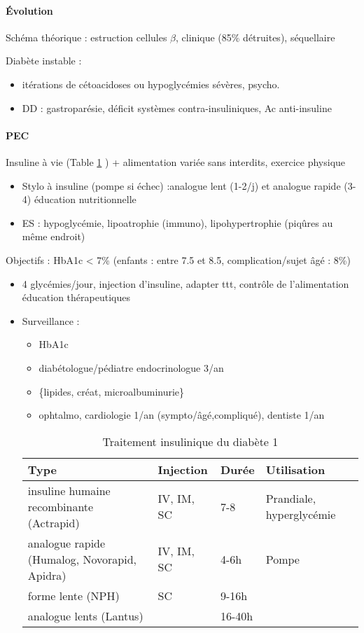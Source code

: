 \documentclass{book}
\begin{document}
\paragraph{Évolution}
\label{sec:orgc496964}
Schéma théorique : estruction cellules \(\beta\), clinique (85\% détruites), séquellaire

Diabète instable : 
\begin{itemize}
\item itérations de cétoacidoses ou hypoglycémies sévères, psycho.
\item DD : gastroparésie, déficit systèmes contra-insuliniques, Ac anti-insuline
\end{itemize}

\paragraph{PEC}
\label{sec:orga9a80ac}
Insuline à vie (Table \ref{tab:org4e23a09} ) + alimentation variée sans interdits, exercice physique
\begin{itemize}
\item Stylo à insuline (pompe si échec) :analogue lent (1-2/j) et analogue rapide (3-4) \thus
éducation nutritionnelle
\item ES : hypoglycémie, lipoatrophie (immuno), lipohypertrophie (piqûres au même endroit)
\end{itemize}

Objectifs : HbA1c < 7\% (enfants : entre 7.5 et 8.5, complication/sujet âgé : 8\%)
\begin{itemize}
\item 4 glycémies/jour, injection d'insuline, adapter ttt, contrôle de l'alimentation \thus
éducation thérapeutiques
\item Surveillance :
\begin{itemize}
\item HbA1c
\item diabétologue/pédiatre endocrinologue 3/an
\item \{lipides, créat, microalbuminurie\}
\item ophtalmo, cardiologie 1/an (sympto/âgé,compliqué), dentiste 1/an
\end{itemize}

\begin{table}[htbp]
\caption{\label{tab:org4e23a09}
Traitement insulinique du diabète 1}
\centering
\begin{tabular}{llll}
\toprule
Type & Injection & Durée & Utilisation\\
\midrule
insuline humaine recombinante (Actrapid) & IV, IM, SC & 7-8 & Prandiale, hyperglycémie\\
analogue rapide (Humalog, Novorapid, Apidra) & IV, IM, SC & 4-6h & Pompe\\
forme lente (NPH) & SC & 9-16h & \\
analogue lents (Lantus) &  & 16-40h & \\
\bottomrule
\end{tabular}
\end{table}
\end{itemize}
\end{document}
